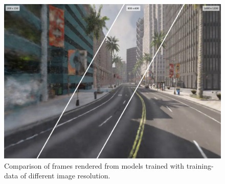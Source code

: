 \begin{figure}[h]
    \centering
    \includegraphics[width=1.0\textwidth]{figures/image-size-comparison.png}
    \caption{Comparison of frames rendered from models trained with training-data of different image resolution.}
    \label{fig:image-size-comparison}
\end{figure}